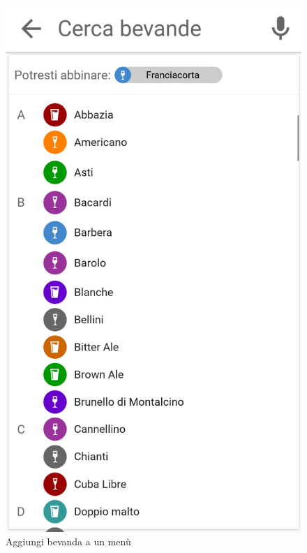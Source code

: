 \begin{figure}[H]
\begin{minipage}{.49\textwidth}
		\includegraphics[width=\textwidth]{img/wireframe/aggiungi_bevanda_consiglio.png}
		\caption{Aggiungi bevanda a un menù}
		\label{fig:aggiungi_bevanda}
	\end{minipage}
\end{figure}	
